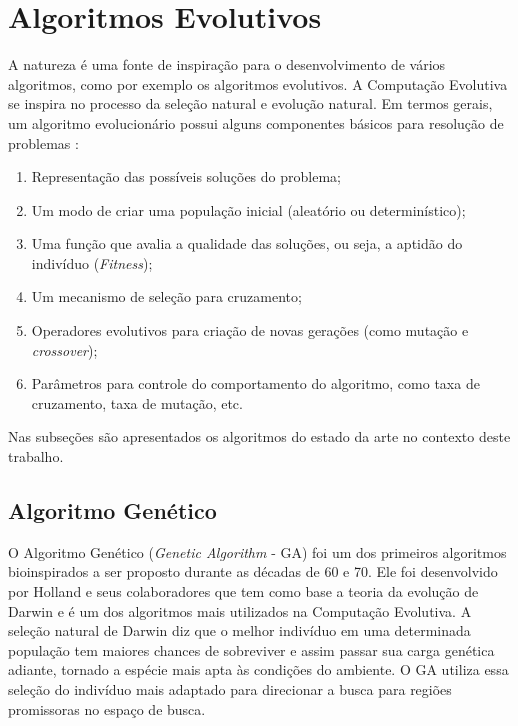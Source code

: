\section{Algoritmos Evolutivos}
\label{sec:evolutionary_algorithms}
A natureza é uma fonte de inspiração para o desenvolvimento de vários algoritmos, como por exemplo os algoritmos evolutivos. A Computação Evolutiva se inspira no processo da seleção natural e evolução natural.
Em termos gerais, um algoritmo evolucionário possui alguns componentes básicos para resolução de problemas \cite{parpinelli2011new}:

\begin{enumerate}
\item Representação das possíveis soluções do problema;
\item Um modo de criar uma população inicial (aleatório ou determinístico);
\item Uma função que avalia a qualidade das soluções, ou seja, a aptidão do indivíduo (\textit{Fitness});
\item Um mecanismo de seleção para cruzamento;
\item Operadores evolutivos para criação de novas gerações (como mutação e \textit{crossover});
\item Parâmetros para controle do comportamento do algoritmo, como taxa de cruzamento, taxa de mutação, etc.
\end{enumerate}

Nas subseções são apresentados os algoritmos do estado da arte no contexto deste trabalho.

\subsection{Algoritmo Genético}
\label{sec:genetic_algorithms}
O Algoritmo Genético (\textit{Genetic Algorithm} - GA) foi um dos primeiros algoritmos bioinspirados a ser proposto durante as décadas de 60 e 70. Ele foi desenvolvido por Holland e seus colaboradores que tem como base a teoria da evolução de Darwin \cite{ga} e é um dos algoritmos mais utilizados na Computação Evolutiva. A seleção natural de Darwin diz que o melhor indivíduo em uma determinada população tem maiores chances de sobreviver e assim passar sua carga genética adiante, tornado a espécie mais apta às condições do ambiente. O GA utiliza essa seleção do indivíduo mais adaptado para direcionar a busca para regiões promissoras no espaço de busca.

